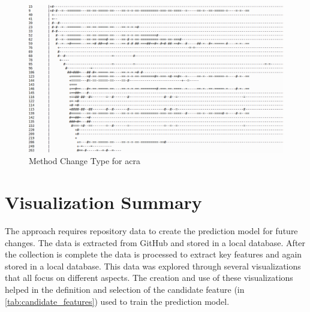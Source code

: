 \begin{landscape}
\thispagestyle{empty}
    \begin{figure}
      \centering
            \includegraphics[width=1.5\textwidth]{images/text_visualization}
        \caption{Method Change Type for acra}
        \label{fig:method_change_type_acra}
    \end{figure}
\end{landscape}
\pagestyle{plain}


\section{Visualization Summary}

The approach requires repository data to create the prediction model for future changes. The data is extracted from GitHub and stored in a local database. After the collection is complete the data is processed to extract key features and again stored in a local database. This data was explored through several visualizations that all focus on different aspects. The creation and use of these visualizations helped in the definition and selection of the candidate feature (in \autoref{tab:candidate_features}) used to train the prediction model.